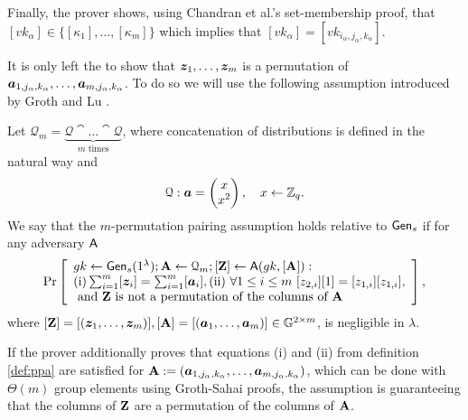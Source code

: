 Finally, the prover  shows, using Chandran et al.'s set-membership proof, that $[vk_\alpha]\in\{[\kappa_1],\ldots,[\kappa_m]\}$ which implies that  $[vk_\alpha]=[vk_{i_\alpha,j_\alpha,k_\alpha}]$.

It is only left the to show that ${\boldsymbol{z}}_1,\ldots,{\boldsymbol{z}}_m$ is a permutation of ${\boldsymbol{a}}_{1,j_\alpha,k_\alpha},\ldots,\allowbreak{\boldsymbol{a}}_{m,j_\alpha,k_\alpha}$. To do so we will use the following assumption introduced by Groth and Lu \cite{AC:GroLu07}.
\begin{definition}\label{def:ppa}
Let $\mathcal{Q}_{m}=\underbrace{\mathcal{Q}\cat\ldots\cat\mathcal{Q}}_{m\text{ times}}$, where concatenation of  distributions is defined in the natural way and 
$$\mathcal{Q}: {\boldsymbol{a}}=\left(\begin{matrix}x\\x^2\end{matrix}\right),\quad x\gets\mathbb{Z}_q.$$
We say that the $m$-permutation pairing assumption holds relative to $\mathsf{Gen}_s$ if for any adversary $\mathsf{A}$
$$
\Pr\left[
\begin{array}{l}
gk\gets\mathsf{Gen}_s(1^\lambda);\mathbf{{A}}\gets\mathcal{Q}_{m};[\mathbf{{Z}}]\gets\mathsf{A}(gk,[\mathbf{{A}}]):\\
\mathrm{(i)} \sum_{i=1}^{m}[{\boldsymbol{z}}_i]=\sum_{i=1}^{m}[{\boldsymbol{a}}_i], \mathrm{(ii)}\ \forall 1\leq i\leq m\ [z_{2,i}][1]=[z_{1,i}][z_{1,i}],\\
\text{ and }\mathbf{{Z}}\text{ is not a permutation of the columns of }\mathbf{{A}}
\end{array}
\right],
$$
where $[\mathbf{{Z}}]=[({\boldsymbol{z}}_1,\ldots,{\boldsymbol{z}}_m)], [\mathbf{{A}}]=[({\boldsymbol{a}}_1,\ldots,{\boldsymbol{a}}_m)]\in\mathbb{G}^{2\times m}$,
is negligible in $\lambda$.
\end{definition}

If the prover additionally proves that equations (i) and (ii) from definition \ref{def:ppa} are satisfied for $\mathbf{{A}}:=({\boldsymbol{a}}_{1,j_\alpha,k_\alpha},\ldots,{\boldsymbol{a}}_{m,j_\alpha,k_\alpha})$, which can be done with $\Theta(m)$ group elements using Groth-Sahai proofs, the assumption is guaranteeing that the columns of $\mathbf{{Z}}$ are a permutation of the columns of $\mathbf{{A}}$.

